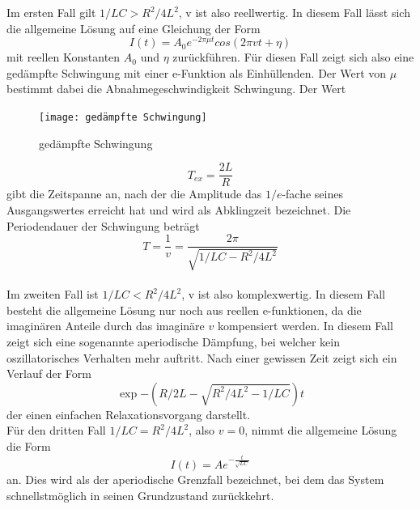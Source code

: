 Im ersten Fall gilt $1/LC>R^2/4L^2$, v ist also reellwertig. In diesem Fall lässt sich die allgemeine Lösung auf eine Gleichung der Form
\begin{equation*}
I(t)=A_0e^{-2\pi \mu t}cos(2\pi vt+\eta)
\end{equation*}
mit reellen Konstanten $A_0$ und $\eta$ zurückführen. Für diesen Fall zeigt sich also eine gedämpfte Schwingung mit einer e-Funktion als Einhüllenden. Der Wert von $\mu$ bestimmt dabei die Abnahmegeschwindigkeit Schwingung. Der Wert
\begin{figure}
\centering
\texttt{[image: gedämpfte Schwingung]}
\caption{gedämpfte Schwingung}
\label{fig:gedämpfte Schwingung}
\end{figure}
\begin{equation}
T_{ex}=\frac{2L}{R}
\end{equation}
gibt die Zeitspanne an, nach der die Amplitude das $1/e$-fache seines Ausgangswertes erreicht hat und wird als Abklingzeit bezeichnet. Die Periodendauer der Schwingung beträgt
\begin{equation*}
T=\frac{1}{v}=\frac{2\pi}{\sqrt{1/LC-R^2/4L^2}}
\end{equation*}
\\
Im zweiten Fall ist $1/LC<R^2/4L^2$, v ist also komplexwertig. In diesem Fall besteht die allgemeine Lösung nur noch aus reellen e-funktionen, da die imaginären Anteile durch das imaginäre $v$ kompensiert werden. In diesem Fall zeigt sich eine sogenannte aperiodische Dämpfung, bei welcher kein oszillatorisches Verhalten mehr auftritt. Nach einer gewissen Zeit zeigt sich ein Verlauf der Form 
\begin{equation*}
\exp{-(R/2L-\sqrt{R^2/4L^2-1/LC})t}
\end{equation*}
der einen einfachen Relaxationsvorgang darstellt. \\
Für den dritten Fall $ 1/LC=R^2/4L^2$, also $v=0$, nimmt die allgemeine Lösung die Form
\begin{equation*}
I(t)=Ae^{-\frac{t}{\sqrt{LC}}}
\end{equation*}
an. Dies wird als der aperiodische Grenzfall bezeichnet, bei dem das System schnellstmöglich in seinen Grundzustand zurückkehrt.
